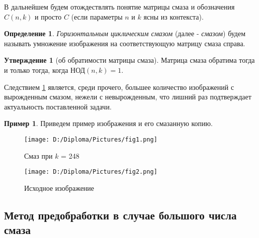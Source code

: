\documentclass[a4paper]{article}
\theoremstyle{definition}
\newtheorem{statement}{Утверждение}[section]
\newtheorem{definition}{Определение}[section]
\newtheorem*{example}{Пример}
\begin{document}
    В дальнейшем будем отождествлять понятие матрицы смаза и обозначения $C(n, k)$ и просто $C$ (если параметры $n$ и $k$ ясны из контекста).
\vspace{0.3cm}


    \begin{definition}
    \label{blur}
	\emph{Горизонтальным циклическим смазом} (далее - \emph{смазом}) будем называть умножение изображения на соответствующую матрицу смаза справа.
    \end{definition}


    \begin{statement}[об обратимости матрицы смаза]
    \label{inverse}
	Матрица смаза обратима тогда и только тогда, когда НОД$(n, k) = 1$.
    \end{statement}


    Следствием \ref{inverse} является, среди прочего, большее количество изображений с вырожденным смазом, нежели с невырожденным, что лишний раз подтверждает актуальность поставленной задачи.


    \begin{example}
    Приведем пример изображения и его смазанную копию.

\begin{minipage}{70mm}
    \begin{figure}[H]
            \texttt{[image: D:/Diploma/Pictures/fig1.png]}
            \label{Fig1}
            \caption[Смаз при $k$ = 248]{Смаз при $k$ = 248}
        \end{figure}
\end{minipage}
\hfill
\begin{minipage}{70mm}
  \begin{figure}[H]
            \texttt{[image: D:/Diploma/Pictures/fig2.png]}
            \label{Fig2}
            \caption[Исходное изображение]{Исходное изображение}
        \end{figure}
\end{minipage}
\hfill

    \end{example}

    \newpage


    \begin{center}
        \section*{Метод предобработки в случае большого числа смаза}
    \end{center}
\end{document}
